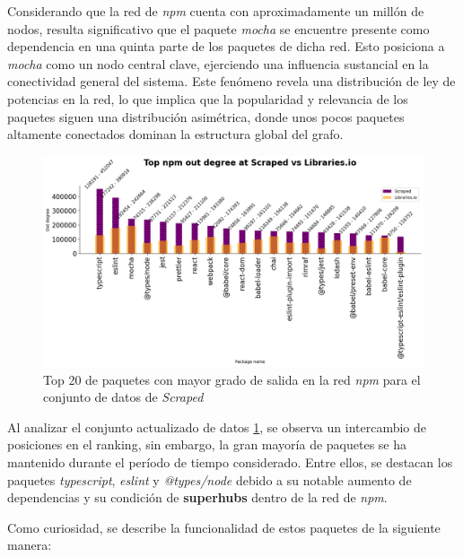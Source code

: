 Considerando que la red de \textit{npm} cuenta con aproximadamente un millón de nodos, resulta significativo que el
paquete \textit{mocha} se encuentre presente como dependencia en una quinta parte de los paquetes de dicha red.
Esto posiciona a \textit{mocha} como un nodo central clave, ejerciendo una influencia sustancial en la conectividad
general del sistema. Este fenómeno revela una distribución de ley de potencias en la red, lo que implica que la
popularidad y relevancia de los paquetes siguen una distribución asimétrica, donde unos pocos paquetes altamente
conectados dominan la estructura global del grafo.

\begin{figure}[ht!]
    \begin{center}
        \includegraphics[width=1\textwidth]{img/npm/outd-sl.png}
        \caption{Top 20 de paquetes con mayor grado de salida en la red \textit{npm} para el conjunto de datos de \textit{Scraped}}
    \end{center}
    \label{fig:npm_outd_scraped}
\end{figure}


Al analizar el conjunto actualizado de datos \ref{fig:npm_outd_scraped}, se observa un intercambio de posiciones en el ranking, sin embargo, la
gran mayoría de paquetes se ha mantenido durante el período de tiempo considerado. Entre ellos, se destacan los
paquetes \textit{typescript}, \textit{eslint} y \textit{@types/node} debido a su notable
aumento de dependencias y su condición de \textbf{superhubs} dentro de la red de \textit{npm}.

Como curiosidad, se describe la funcionalidad de estos paquetes de la siguiente manera:

